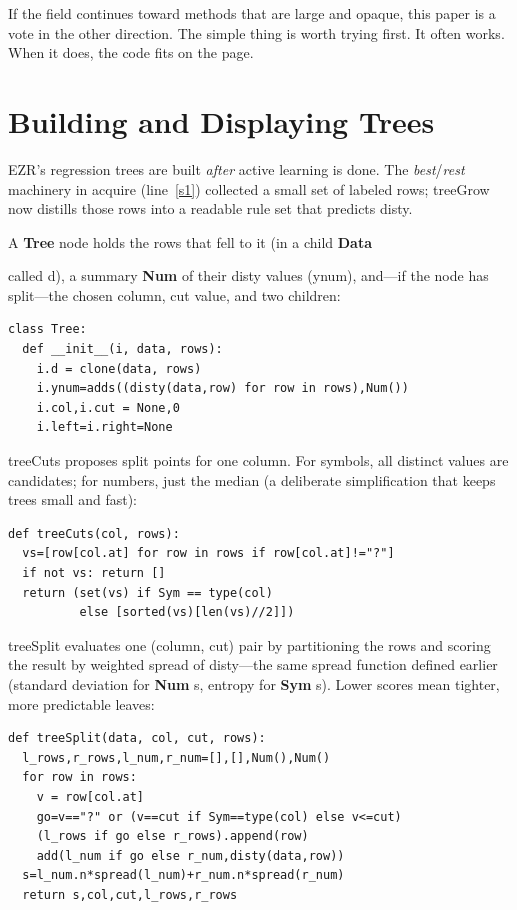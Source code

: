 \documentclass[AMA,STIX2COL]{WileyNJDv5}
\newcommand{\cls}[1]{%
  \setlength{\fboxsep}{1.5pt}%
  \colorbox{clsbg}{\sffamily\bfseries{#1}}%
}
\begin{document}
{If the field continues toward methods that are large and
opaque, this paper is a vote in the other direction. The
simple thing is worth trying first. It often works. When it
does, the code fits on the page.
 

 





\appendix
\section*{Building and Displaying Trees}
 

EZR's regression trees are built {\em after} active learning is done.
The {\em best}/{\em rest} machinery in \textsf{acquire} (line~\ref{s1})
collected a small set of labeled rows; \textsf{treeGrow} now distills
those rows into a readable rule set that predicts \textsf{disty}.

A \cls{Tree} node holds the rows that fell to it (in a child \cls{Data}
called \textsf{d}), a summary \cls{Num} of their \textsf{disty} values
(\textsf{ynum}), and---if the node has split---the chosen column,
cut value, and two children:
\begin{verbatim}
class Tree: 
  def __init__(i, data, rows):
    i.d = clone(data, rows)
    i.ynum=adds((disty(data,row) for row in rows),Num())
    i.col,i.cut = None,0
    i.left=i.right=None
\end{verbatim}
\textsf{treeCuts} proposes split points for one column. For symbols,
all distinct values are candidates; for numbers, just the median (a
deliberate simplification that keeps trees small and fast):
\begin{verbatim}
def treeCuts(col, rows): 
  vs=[row[col.at] for row in rows if row[col.at]!="?"]
  if not vs: return []
  return (set(vs) if Sym == type(col)
          else [sorted(vs)[len(vs)//2]])
\end{verbatim}

\textsf{treeSplit} evaluates one (column, cut) pair by partitioning
the rows and scoring the result by weighted \textsf{spread} of
\textsf{disty}---the same \textsf{spread} function defined earlier
(standard deviation for \cls{Num}s, entropy for \cls{Sym}s). Lower
scores mean tighter, more predictable leaves:
\begin{verbatim}
def treeSplit(data, col, cut, rows): 
  l_rows,r_rows,l_num,r_num=[],[],Num(),Num()
  for row in rows:
    v = row[col.at]
    go=v=="?" or (v==cut if Sym==type(col) else v<=cut)
    (l_rows if go else r_rows).append(row)
    add(l_num if go else r_num,disty(data,row))
  s=l_num.n*spread(l_num)+r_num.n*spread(r_num)
  return s,col,cut,l_rows,r_rows
\end{verbatim}

}
\end{document}
